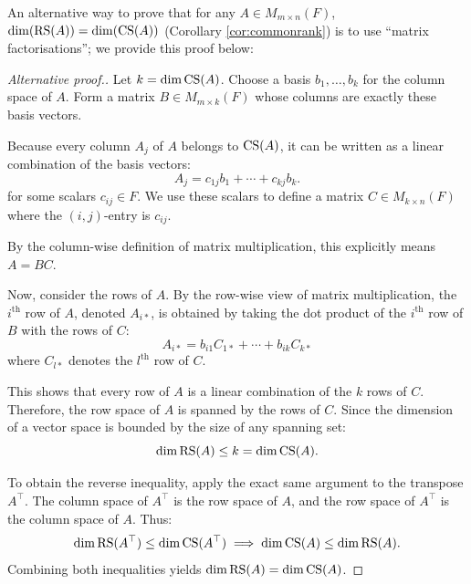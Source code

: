 \documentclass[../linear_algebra_and_groups.tex]{subfiles}
\begin{document}
An alternative way to prove that for any $A\in M_{m\times n}(F)$, $\dim(\operatorname{RS}(A))=\dim(\operatorname{CS}(A))$ (Corollary \ref{cor:commonrank}) is to use ``matrix factorisations''; we provide this proof below:

\begin{proof}[Alternative proof.]
    Let $k = \dim \operatorname{CS}(A)$. Choose a basis $b_1, \dots, b_k$ for the column space of $A$. Form a matrix $B \in M_{m \times k}(F)$ whose columns are exactly these basis vectors. 
    
    Because every column $A_j$ of $A$ belongs to $\operatorname{CS}(A)$, it can be written as a linear combination of the basis vectors:
    \[ A_j = c_{1j}b_1 + \cdots + c_{kj}b_k. \]
    for some scalars $c_{ij} \in F$. We use these scalars to define a matrix $C \in M_{k \times n}(F)$ where the $(i,j)$-entry is $c_{ij}$. 
    
    By the column-wise definition of matrix multiplication, this explicitly means $A = BC$. 
    
    Now, consider the rows of $A$. By the row-wise view of matrix multiplication, the $i^{\mathrm{th}}$ row of $A$, denoted $A_{i*}$, is obtained by taking the dot product of the $i^{\mathrm{th}}$ row of $B$ with the rows of $C$:
    \[ A_{i*} = b_{i1}C_{1*} + \cdots + b_{ik}C_{k*} \]
    where $C_{l*}$ denotes the $l^{\mathrm{th}}$ row of $C$. 
    
    This shows that every row of $A$ is a linear combination of the $k$ rows of $C$. Therefore, the row space of $A$ is spanned by the rows of $C$. Since the dimension of a vector space is bounded by the size of any spanning set:
    \[ \dim \operatorname{RS}(A) \le k = \dim \operatorname{CS}(A). \]
    
    To obtain the reverse inequality, apply the exact same argument to the transpose $A^\top$. The column space of $A^\top$ is the row space of $A$, and the row space of $A^\top$ is the column space of $A$. Thus:
    \[ \dim \operatorname{RS}(A^\top) \le \dim \operatorname{CS}(A^\top) \implies \dim \operatorname{CS}(A) \le \dim \operatorname{RS}(A). \]
    Combining both inequalities yields $\dim \operatorname{RS}(A) = \dim \operatorname{CS}(A)$.
    \qedhere
\end{proof}
\end{document}
